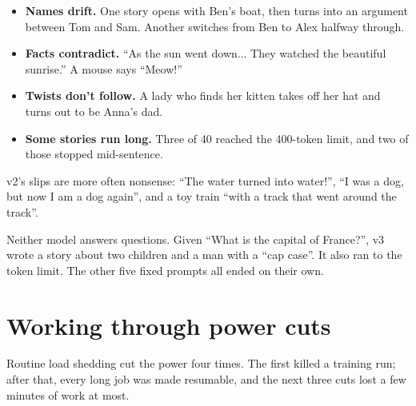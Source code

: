 \documentclass[11pt,a4paper]{article}
\begin{document}
\begin{itemize}
\item \textbf{Names drift.} One story opens with Ben's boat, then turns into an argument between Tom and Sam. Another switches from Ben to Alex halfway through.
\item \textbf{Facts contradict.} “As the sun went down... They watched the beautiful sunrise.” A mouse says “Meow!”
\item \textbf{Twists don't follow.} A lady who finds her kitten takes off her hat and turns out to be Anna's dad.
\item \textbf{Some stories run long.} Three of 40 reached the 400-token limit, and two of those stopped mid-sentence.
\end{itemize}

v2's slips are more often nonsense: “The water turned into water!”, “I was a dog, but now I am a dog again”, and a toy train “with a track that went around the track”.

Neither model answers questions. Given “What is the capital of France?”, v3 wrote a story about two children and a man with a “cap case”. It also ran to the token limit. The other five fixed prompts all ended on their own.

\section*{Working through power cuts}
{}

Routine load shedding cut the power four times. The first killed a training run; after that, every long job was made resumable, and the next three cuts lost a few minutes of work at most.
\end{document}
